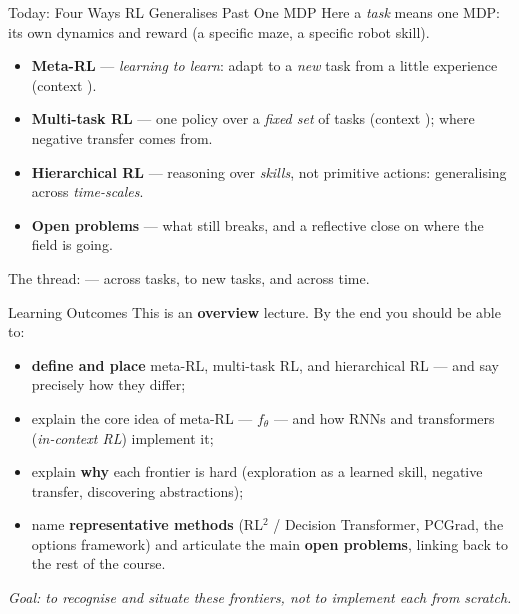 \begin{frame}{Today: Four Ways RL Generalises Past One MDP}
\footnotesize Here a \emph{task} means one MDP: its own dynamics and reward (a specific
maze, a specific robot skill).\par\normalsize
\vspace{0.5em}
\begin{itemize}\itemsep0.5em
    \item \textbf{Meta-RL} --- \emph{learning to learn}: adapt to a \emph{new} task from a
          little experience (context ).
    \item \textbf{Multi-task RL} --- one policy over a \emph{fixed set} of tasks (context
          ); where negative transfer comes from.
    \item \textbf{Hierarchical RL} --- reasoning over \emph{skills}, not primitive actions:
          generalising across \emph{time-scales}.
    \item \textbf{Open problems} --- what still breaks, and a reflective close on where the
          field is going.
\end{itemize}
\vfill
\begin{center}
The thread:  --- across tasks, to new
tasks, and across time.
\end{center}
\end{frame}

\begin{frame}{Learning Outcomes}
This is an \textbf{overview} lecture. By the end you should be able to:
\begin{itemize}\itemsep0.3em
    \item \textbf{define and place} meta-RL, multi-task RL, and hierarchical RL --- and say
          precisely how they differ;
    \item explain the core idea of meta-RL ---  $f_\theta$
          --- and how RNNs and transformers (\emph{in-context RL}) implement it;
    \item explain \textbf{why} each frontier is hard (exploration as a learned skill,
          negative transfer, discovering abstractions);
    \item name \textbf{representative methods} (RL$^2$ / Decision Transformer, PCGrad, the
          options framework) and articulate the main \textbf{open problems}, linking back to
          the rest of the course.
\end{itemize}
\vspace{0.4em}
\begin{center}\footnotesize\itshape
Goal: to \emph{recognise and situate} these frontiers, not to implement each from scratch.
\end{center}
\end{frame}

